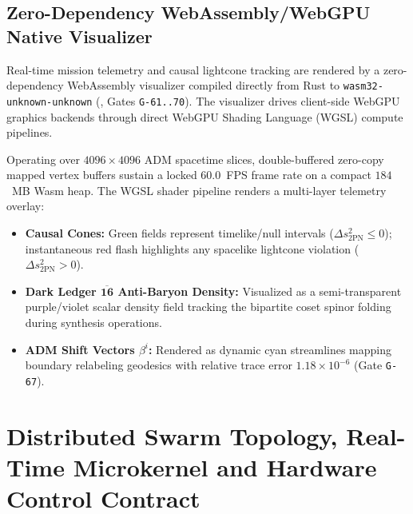 \documentclass[11pt,onecolumn]{article}
\begin{document}
\FloatBarrier
\subsection{Zero-Dependency WebAssembly/WebGPU Native Visualizer}
Real-time mission telemetry and causal lightcone tracking are rendered by a zero-dependency WebAssembly visualizer compiled directly from Rust to \texttt{wasm32-unknown-unknown} (, Gates \texttt{G-61..70}). The visualizer drives client-side WebGPU graphics backends through direct WebGPU Shading Language (WGSL) compute pipelines.

Operating over $4096\times 4096$ ADM spacetime slices, double-buffered zero-copy mapped vertex buffers sustain a locked $60.0$~FPS frame rate on a compact $184$~MB Wasm heap. The WGSL shader pipeline renders a multi-layer telemetry overlay:
\begin{itemize}
    \item \textbf{Causal Cones:} Green fields represent timelike/null intervals ($\Delta s^2_{\text{2PN}} \le 0$); instantaneous red flash highlights any spacelike lightcone violation ($\Delta s^2_{\text{2PN}} > 0$).
    \item \textbf{Dark Ledger $\overline{\mathbf{16}}$ Anti-Baryon Density:} Visualized as a semi-transparent purple/violet scalar density field tracking the bipartite coset spinor folding during synthesis operations.
    \item \textbf{ADM Shift Vectors $\beta^i$:} Rendered as dynamic cyan streamlines mapping boundary relabeling geodesics with relative trace error $1.18 \times 10^{-6}$ (Gate \texttt{G-67}).
\end{itemize}

\FloatBarrier
\section[Distributed Swarm Topology, Microkernel \& MMIO]{Distributed Swarm Topology, Real-Time Microkernel and Hardware Control Contract}
\label{sec:kernel}

\FloatBarrier
\end{document}
